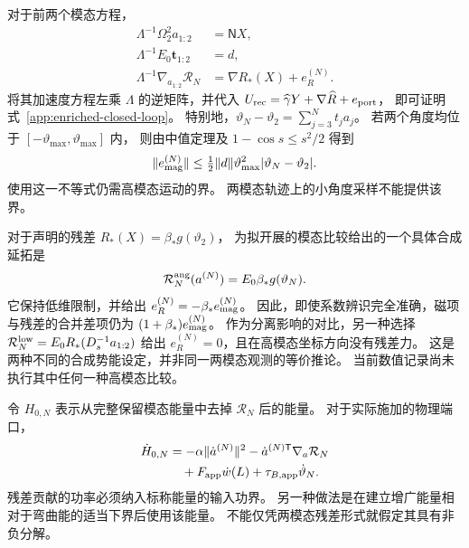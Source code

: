 对于前两个模态方程，
\begin{align}
 \Lambda^{-1}\Omega_2^2a_{1:2}&=\mathsf N X,\nonumber\\
 \Lambda^{-1}E_0\boldsymbol t_{1:2}&=d,\nonumber\\
 \Lambda^{-1}\nabla_{a_{1:2}}\mathcal R_N
 &=\nabla R_*(X)+e_R^{(N)}.
 \label{sm:enriched-projection}
\end{align}
将其加速度方程左乘 $\Lambda$ 的逆矩阵，并代入
$U_{\rm rec}=\widehat\gamma Y+\nabla\widehat R+e_{\rm port}$，
即可证明式~\eqref{app:enriched-closed-loop}。
特别地，$\vartheta_N-\vartheta_2=\sum_{j=3}^Nt_ja_j$。
若两个角度均位于 $[-\vartheta_{\max},\vartheta_{\max}]$ 内，
则由中值定理及 $1-\cos s\le s^2/2$ 得到
\begin{equation}
 \|e_{\rm mag}^{(N)}\|
 \le\tfrac12\|d\|\vartheta_{\max}^2
                   |\vartheta_N-\vartheta_2|.
 \label{sm:angle-defect-bound}
\end{equation}
使用这一不等式仍需高模态运动的界。
两模态轨迹上的小角度采样不能提供该界。

对于声明的残差 $R_*(X)=\beta_*g(\vartheta_2)$，
为拟开展的模态比较给出的一个具体合成延拓是
\begin{equation}
 \mathcal R_N^{\rm ang}(a^{(N)})=E_0\beta_*g(\vartheta_N).
 \label{sm:angle-residual-extension}
\end{equation}
它保持低维限制，并给出 $e_R^{(N)}=-\beta_*e_{\rm mag}^{(N)}$。
因此，即使系数辨识完全准确，磁项与残差的合并差项仍为
$(1+\beta_*)e_{\rm mag}^{(N)}$。
作为分离影响的对比，另一种选择
$\mathcal R_N^{\rm low}=E_0R_*(D_s^{-1}a_{1:2})$ 给出
$e_R^{(N)}=0$，且在高模态坐标方向没有残差力。
这是两种不同的合成势能设定，并非同一两模态观测的等价推论。
当前数值记录尚未执行其中任何一种高模态比较。

令 $H_{0,N}$ 表示从完整保留模态能量中去掉 $\mathcal R_N$ 后的能量。
对于实际施加的物理端口，
\begin{align}
 \dot H_{0,N}
 &=-\alpha\|\dot a^{(N)}\|^2
       -\dot a^{(N)\mathsf T}\nabla_a\mathcal R_N\nonumber\\
 &\quad+F_{\rm app}\dot w(L)+\tau_{B,\rm app}\dot\vartheta_N.
 \label{sm:enriched-power}
\end{align}
残差贡献的功率必须纳入标称能量的输入功界。
另一种做法是在建立增广能量相对于弯曲能的适当下界后使用该能量。
不能仅凭两模态残差形式就假定其具有非负分解。

